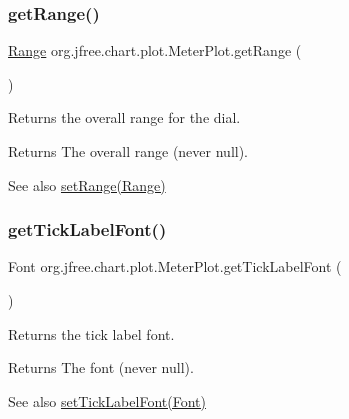 \subsubsection{\texorpdfstring{get\+Range()}{getRange()}}
{\footnotesize\ttfamily \mbox{\hyperlink{classorg_1_1jfree_1_1data_1_1_range}{Range}} org.\+jfree.\+chart.\+plot.\+Meter\+Plot.\+get\+Range (\begin{DoxyParamCaption}{ }\end{DoxyParamCaption})}

Returns the overall range for the dial.

\begin{DoxyReturn}{Returns}
The overall range (never {\ttfamily null}).
\end{DoxyReturn}
\begin{DoxySeeAlso}{See also}
\mbox{\hyperlink{classorg_1_1jfree_1_1chart_1_1plot_1_1_meter_plot_a6f9eba78758e713fcfeeee352d740e2f}{set\+Range(\+Range)}} 
\end{DoxySeeAlso}
\mbox{\label{classorg_1_1jfree_1_1chart_1_1plot_1_1_meter_plot_aec1151f0cb9d83a473e0b47cfebffeb4}} 
\subsubsection{\texorpdfstring{get\+Tick\+Label\+Font()}{getTickLabelFont()}}
{\footnotesize\ttfamily Font org.\+jfree.\+chart.\+plot.\+Meter\+Plot.\+get\+Tick\+Label\+Font (\begin{DoxyParamCaption}{ }\end{DoxyParamCaption})}

Returns the tick label font.

\begin{DoxyReturn}{Returns}
The font (never {\ttfamily null}).
\end{DoxyReturn}
\begin{DoxySeeAlso}{See also}
\mbox{\hyperlink{classorg_1_1jfree_1_1chart_1_1plot_1_1_meter_plot_ad56c6b3df6614f5cada840323c89120b}{set\+Tick\+Label\+Font(\+Font)}} 
\end{DoxySeeAlso}
\mbox{\label{classorg_1_1jfree_1_1chart_1_1plot_1_1_meter_plot_af7eb3b4f3cb33da29b6d951761e83eb1}} 
